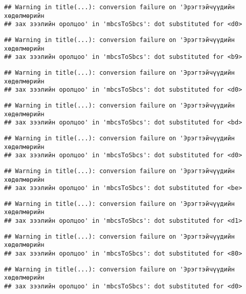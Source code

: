 \documentclass[]{article}
\begin{document}
\begin{verbatim}
## Warning in title(...): conversion failure on 'Эрэгтэйчүүдийн хөдөлмөрийн
## зах зээлийн оролцоо' in 'mbcsToSbcs': dot substituted for <d0>
\end{verbatim}

\begin{verbatim}
## Warning in title(...): conversion failure on 'Эрэгтэйчүүдийн хөдөлмөрийн
## зах зээлийн оролцоо' in 'mbcsToSbcs': dot substituted for <b9>
\end{verbatim}

\begin{verbatim}
## Warning in title(...): conversion failure on 'Эрэгтэйчүүдийн хөдөлмөрийн
## зах зээлийн оролцоо' in 'mbcsToSbcs': dot substituted for <d0>
\end{verbatim}

\begin{verbatim}
## Warning in title(...): conversion failure on 'Эрэгтэйчүүдийн хөдөлмөрийн
## зах зээлийн оролцоо' in 'mbcsToSbcs': dot substituted for <bd>
\end{verbatim}

\begin{verbatim}
## Warning in title(...): conversion failure on 'Эрэгтэйчүүдийн хөдөлмөрийн
## зах зээлийн оролцоо' in 'mbcsToSbcs': dot substituted for <d0>
\end{verbatim}

\begin{verbatim}
## Warning in title(...): conversion failure on 'Эрэгтэйчүүдийн хөдөлмөрийн
## зах зээлийн оролцоо' in 'mbcsToSbcs': dot substituted for <be>
\end{verbatim}

\begin{verbatim}
## Warning in title(...): conversion failure on 'Эрэгтэйчүүдийн хөдөлмөрийн
## зах зээлийн оролцоо' in 'mbcsToSbcs': dot substituted for <d1>
\end{verbatim}

\begin{verbatim}
## Warning in title(...): conversion failure on 'Эрэгтэйчүүдийн хөдөлмөрийн
## зах зээлийн оролцоо' in 'mbcsToSbcs': dot substituted for <80>
\end{verbatim}

\begin{verbatim}
## Warning in title(...): conversion failure on 'Эрэгтэйчүүдийн хөдөлмөрийн
## зах зээлийн оролцоо' in 'mbcsToSbcs': dot substituted for <d0>
\end{verbatim}
\end{document}
